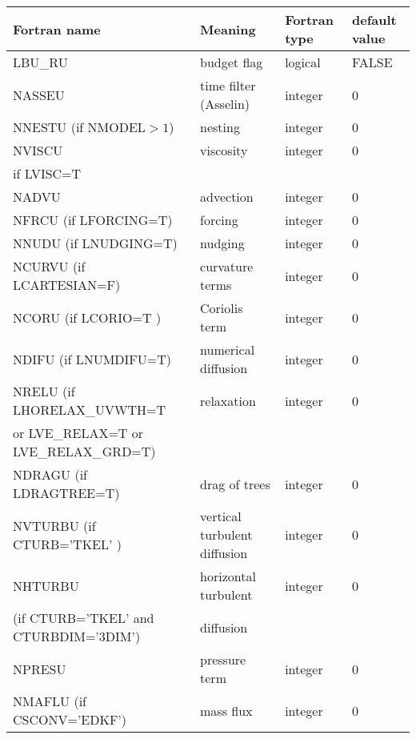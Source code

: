 \begin{longtable} {|p{}|p{}|>{\centering}p{}|p{}<{\centering}|}
\hline
Fortran name & Meaning & Fortran type & default value \\
\hline \hline
\endhead
LBU\_RU  & budget flag & logical & FALSE  \index{LBU\_RU!\innam{NAM\_BU\_RU}}\\\hline
NASSEU   & time filter (Asselin) & integer  &  0  \index{NASSEU!\innam{NAM\_BU\_RU}} \\\hline
NNESTU (if NMODEL$>1$)   & nesting           & integer  &  0 \index{NNESTU!\innam{NAM\_BU\_RU}} \\\hline
NVISCU   & viscosity         & integer  &  0 \index{NVISCU!\innam{NAM\_BU\_RU}}\\
if LVISC=T &  &   &   \\\hline
NADVU   & advection  & integer  &  0 \index{NADVU!\innam{NAM\_BU\_RU}} \\\hline
NFRCU (if LFORCING=T)   & forcing           & integer  &  0 \index{NFRCU!\innam{NAM\_BU\_RU}} \\\hline
NNUDU  (if LNUDGING=T)  & nudging           & integer  &  0 \index{NNUDU!\innam{NAM\_BU\_RU}} \\\hline
NCURVU (if LCARTESIAN=F) & curvature terms   & integer  &  0 \index{NCURVU!\innam{NAM\_BU\_RU}} \\\hline
NCORU (if LCORIO=T ) & Coriolis  term    & integer  &  0 \index{NCORU!\innam{NAM\_BU\_RU}}\\\hline
NDIFU (if LNUMDIFU=T) & numerical diffusion & integer  &  0 \index{NDIFU!\innam{NAM\_BU\_RU}} \\\hline
NRELU (if LHORELAX\_UVWTH=T & relaxation  & integer  &  0 \index{NRELU!\innam{NAM\_BU\_RU}} \\ \nopagebreak
 or LVE\_RELAX=T or LVE\_RELAX\_GRD=T) &  &   &   \\\hline
NDRAGU (if LDRAGTREE=T) & drag of trees & integer  &  0 \index{NDRAGU!\innam{NAM\_BU\_RU}} \\\hline
NVTURBU (if CTURB='TKEL' ) & vertical turbulent diffusion & integer  &  0 \index{NVTURBU!\innam{NAM\_BU\_RU}}\\\hline
NHTURBU & horizontal turbulent  & integer  &  0 \index{NHTURBU!\innam{NAM\_BU\_RU}}\\ \nopagebreak
(if CTURB='TKEL' and CTURBDIM='3DIM') &diffusion &   &  \\\hline
NPRESU   & pressure term       & integer  &  0    \index{NPRESU!\innam{NAM\_BU\_RU}} \\\hline
NMAFLU (if CSCONV='EDKF')  & mass flux        & integer  &  0 \index{NMAFLU!\innam{NAM\_BU\_RU}}\\\hline
\end{longtable}

